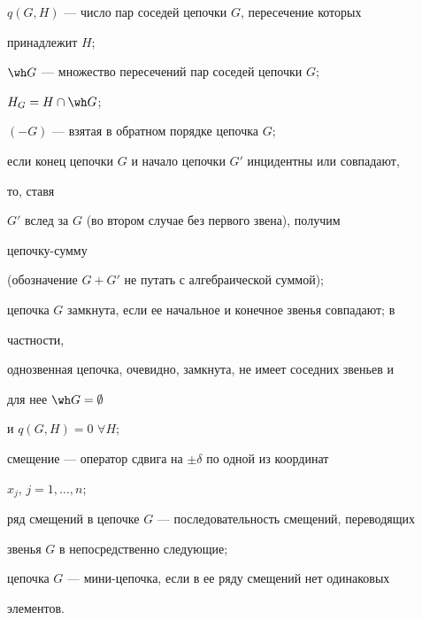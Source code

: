  


$q(G,H)$ --- число пар соседей цепочки $G$, пересечение которых 


принадлежит $H$; 


 


$\wh G$ --- множество пересечений пар соседей цепочки $G$; 


 


$H_G=H\cap\wh G$; 


 


$(-G)$ --- взятая в обратном порядке цепочка $G$; 


 


если конец цепочки $G$ и начало цепочки $G'$ инцидентны или совпадают, 


то, ставя 


$G'$ вслед за $G$ (во втором случае без первого звена), получим 


цепочку-сумму 


(обозначение $G+G'$ не путать с алгебраической суммой); 


 


цепочка $G$ замкнута, если ее начальное и конечное звенья совпадают; в 


частности, 


однозвенная цепочка, очевидно, замкнута, не имеет соседних звеньев и 


для нее $\wh G=\emptyset$ 


и $q(G,H)=0$ $\forall H$; 


 


смещение --- оператор сдвига на $\pm\delta$ по одной из координат 


$x_j$, $j=1,\dotsc,n$; 


 


ряд смещений в цепочке $G$ --- последовательность смещений, переводящих 


звенья $G$ в непосредственно следующие; 


 


цепочка $G$ --- мини-цепочка, если в ее ряду смещений нет одинаковых 


элементов. 


 


